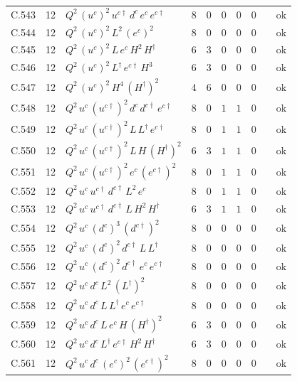{\begin{longtable}{@{}ll>{\raggedright\arraybackslash}p{6.4cm}rrllllr@{}}
C.543 & 12 & $Q^{2}\,(u^c)^{2}\,u^{c\dagger}\,d^c\,e^c\,e^{c\dagger}$ & 8 & 0 & $0$ & $0$ & $0$ &  & ok \\
C.544 & 12 & $Q^{2}\,(u^c)^{2}\,L^{2}\,(e^c)^{2}$ & 8 & 0 & $0$ & $0$ & $0$ &  & ok \\
C.545 & 12 & $Q^{2}\,(u^c)^{2}\,L\,e^c\,H^{2}\,H^\dagger$ & 6 & 3 & $0$ & $0$ & $0$ &  & ok \\
C.546 & 12 & $Q^{2}\,(u^c)^{2}\,L^\dagger\,e^{c\dagger}\,H^{3}$ & 6 & 3 & $0$ & $0$ & $0$ &  & ok \\
C.547 & 12 & $Q^{2}\,(u^c)^{2}\,H^{4}\,(H^\dagger)^{2}$ & 4 & 6 & $0$ & $0$ & $0$ &  & ok \\
C.548 & 12 & $Q^{2}\,u^c\,(u^{c\dagger})^{2}\,d^c\,d^{c\dagger}\,e^{c\dagger}$ & 8 & 0 & $1$ & $1$ & $0$ &  & ok \\
C.549 & 12 & $Q^{2}\,u^c\,(u^{c\dagger})^{2}\,L\,L^\dagger\,e^{c\dagger}$ & 8 & 0 & $1$ & $1$ & $0$ &  & ok \\
C.550 & 12 & $Q^{2}\,u^c\,(u^{c\dagger})^{2}\,L\,H\,(H^\dagger)^{2}$ & 6 & 3 & $1$ & $1$ & $0$ &  & ok \\
C.551 & 12 & $Q^{2}\,u^c\,(u^{c\dagger})^{2}\,e^c\,(e^{c\dagger})^{2}$ & 8 & 0 & $1$ & $1$ & $0$ &  & ok \\
C.552 & 12 & $Q^{2}\,u^c\,u^{c\dagger}\,d^{c\dagger}\,L^{2}\,e^c$ & 8 & 0 & $1$ & $1$ & $0$ &  & ok \\
C.553 & 12 & $Q^{2}\,u^c\,u^{c\dagger}\,d^{c\dagger}\,L\,H^{2}\,H^\dagger$ & 6 & 3 & $1$ & $1$ & $0$ &  & ok \\
C.554 & 12 & $Q^{2}\,u^c\,(d^c)^{3}\,(d^{c\dagger})^{2}$ & 8 & 0 & $0$ & $0$ & $0$ &  & ok \\
C.555 & 12 & $Q^{2}\,u^c\,(d^c)^{2}\,d^{c\dagger}\,L\,L^\dagger$ & 8 & 0 & $0$ & $0$ & $0$ &  & ok \\
C.556 & 12 & $Q^{2}\,u^c\,(d^c)^{2}\,d^{c\dagger}\,e^c\,e^{c\dagger}$ & 8 & 0 & $0$ & $0$ & $0$ &  & ok \\
C.557 & 12 & $Q^{2}\,u^c\,d^c\,L^{2}\,(L^\dagger)^{2}$ & 8 & 0 & $0$ & $0$ & $0$ &  & ok \\
C.558 & 12 & $Q^{2}\,u^c\,d^c\,L\,L^\dagger\,e^c\,e^{c\dagger}$ & 8 & 0 & $0$ & $0$ & $0$ &  & ok \\
C.559 & 12 & $Q^{2}\,u^c\,d^c\,L\,e^c\,H\,(H^\dagger)^{2}$ & 6 & 3 & $0$ & $0$ & $0$ &  & ok \\
C.560 & 12 & $Q^{2}\,u^c\,d^c\,L^\dagger\,e^{c\dagger}\,H^{2}\,H^\dagger$ & 6 & 3 & $0$ & $0$ & $0$ &  & ok \\
C.561 & 12 & $Q^{2}\,u^c\,d^c\,(e^c)^{2}\,(e^{c\dagger})^{2}$ & 8 & 0 & $0$ & $0$ & $0$ &  & ok \\

\end{longtable}}
